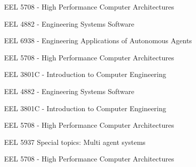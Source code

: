 EEL 5708 - High Performance Computer Architectures


EEL 4882 - Engineering Systems Software


EEL 6938 - Engineering Applications of Autonomous Agents


EEL 5708 - High Performance Computer Architectures


EEL 3801C - Introduction to Computer Engineering

EEL 4882 - Engineering Systems Software


EEL 3801C - Introduction to Computer Engineering


EEL 5708 - High Performance Computer Architectures


EEL 5937 Special topics: Multi agent systems


EEL 5708 - High Performance Computer Architectures
